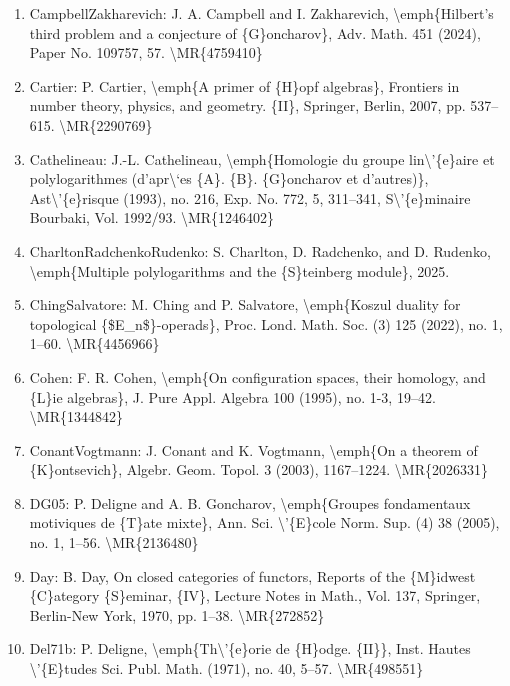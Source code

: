 \documentclass[11pt]{article}
\begin{document}
\begin{enumerate}[leftmargin=*]
  \item CampbellZakharevich: J. A. Campbell and I. Zakharevich, \textbackslash{}emph\{Hilbert's third problem and a conjecture of \{G\}oncharov\}, Adv. Math. 451 (2024), Paper No. 109757, 57. \textbackslash{}MR\{4759410\}
  \item Cartier: P. Cartier, \textbackslash{}emph\{A primer of \{H\}opf algebras\}, Frontiers in number theory, physics, and geometry. \{II\}, Springer, Berlin, 2007, pp. 537--615. \textbackslash{}MR\{2290769\}
  \item Cathelineau: J.-L. Cathelineau, \textbackslash{}emph\{Homologie du groupe lin\textbackslash{}'\{e\}aire et polylogarithmes (d'apr\textbackslash{}`es \{A\}. \{B\}. \{G\}oncharov et d'autres)\}, Ast\textbackslash{}'\{e\}risque (1993), no. 216, Exp. No. 772, 5, 311--341, S\textbackslash{}'\{e\}minaire Bourbaki, Vol. 1992/93. \textbackslash{}MR\{1246402\}
  \item CharltonRadchenkoRudenko: S. Charlton, D. Radchenko, and D. Rudenko, \textbackslash{}emph\{Multiple polylogarithms and the \{S\}teinberg module\}, 2025.
  \item ChingSalvatore: M. Ching and P. Salvatore, \textbackslash{}emph\{Koszul duality for topological \{\$E\_n\$\}-operads\}, Proc. Lond. Math. Soc. (3) 125 (2022), no. 1, 1--60. \textbackslash{}MR\{4456966\}
  \item Cohen: F. R. Cohen, \textbackslash{}emph\{On configuration spaces, their homology, and \{L\}ie algebras\}, J. Pure Appl. Algebra 100 (1995), no. 1-3, 19--42. \textbackslash{}MR\{1344842\}
  \item ConantVogtmann: J. Conant and K. Vogtmann, \textbackslash{}emph\{On a theorem of \{K\}ontsevich\}, Algebr. Geom. Topol. 3 (2003), 1167--1224. \textbackslash{}MR\{2026331\}
  \item DG05: P. Deligne and A. B. Goncharov, \textbackslash{}emph\{Groupes fondamentaux motiviques de \{T\}ate mixte\}, Ann. Sci. \textbackslash{}'\{E\}cole Norm. Sup. (4) 38 (2005), no. 1, 1--56. \textbackslash{}MR\{2136480\}
  \item Day: B. Day, On closed categories of functors, Reports of the \{M\}idwest \{C\}ategory \{S\}eminar, \{IV\}, Lecture Notes in Math., Vol. 137, Springer, Berlin-New York, 1970, pp. 1--38. \textbackslash{}MR\{272852\}
  \item Del71b: P. Deligne, \textbackslash{}emph\{Th\textbackslash{}'\{e\}orie de \{H\}odge. \{II\}\}, Inst. Hautes \textbackslash{}'\{E\}tudes Sci. Publ. Math. (1971), no. 40, 5--57. \textbackslash{}MR\{498551\}

\end{enumerate}
\end{document}
